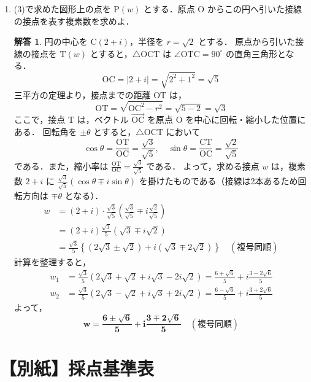 \documentclass[dvipdfmx]{jlreq}
\theoremstyle{definition}
\newtheorem*{solution}{解答}
\begin{document}
\begin{enumerate}[label=(\arabic*)]
    \item (3)で求めた図形上の点を $\mathrm{P}(w)$ とする．原点 $\mathrm{O}$ からこの円へ引いた接線の接点を表す複素数を求めよ．
    \begin{solution}
    円の中心を $\mathrm{C}(2+i)$，半径を $r=\sqrt{2}$ とする．
    原点から引いた接線の接点を $\mathrm{T}(w)$ とすると，$\triangle \mathrm{OCT}$ は $\angle \mathrm{OTC} = 90^\circ$ の直角三角形となる．
    \[ \mathrm{OC} = |2+i| = \sqrt{2^2+1^2} = \sqrt{5} \]
    三平方の定理より，接点までの距離 $\mathrm{OT}$ は，
    \[ \mathrm{OT} = \sqrt{\mathrm{OC}^2 - r^2} = \sqrt{5 - 2} = \sqrt{3} \]
    ここで，接点 $\mathrm{T}$ は，ベクトル $\vec{\mathrm{OC}}$ を原点 $\mathrm{O}$ を中心に回転・縮小した位置にある．
    回転角を $\pm \theta$ とすると，$\triangle \mathrm{OCT}$ において
    \[ \cos \theta = \frac{\mathrm{OT}}{\mathrm{OC}} = \frac{\sqrt{3}}{\sqrt{5}}, \quad \sin \theta = \frac{\mathrm{CT}}{\mathrm{OC}} = \frac{\sqrt{2}}{\sqrt{5}} \]
    である．また，縮小率は $\displaystyle\frac{\mathrm{OT}}{\mathrm{OC}} = \frac{\sqrt{3}}{\sqrt{5}}$ である．
    よって，求める接点 $w$ は，複素数 $2+i$ に $\displaystyle\frac{\sqrt{3}}{\sqrt{5}} (\cos \theta \mp i \sin \theta)$ を掛けたものである（接線は2本あるため回転方向は $\mp \theta$ となる）．
    \begin{align*}
        w &= (2+i) \cdot \frac{\sqrt{3}}{\sqrt{5}} \left( \frac{\sqrt{3}}{\sqrt{5}} \mp i \frac{\sqrt{2}}{\sqrt{5}} \right) \\
          &= (2+i) \frac{\sqrt{3}}{5} (\sqrt{3} \mp i\sqrt{2}) \\
          &= \frac{\sqrt{3}}{5} \left\{ (2\sqrt{3} \pm \sqrt{2}) + i(\sqrt{3} \mp 2\sqrt{2}) \right\} \quad (\text{複号同順})
    \end{align*}
    計算を整理すると，
    \begin{align*}
        w_1 &= \frac{\sqrt{3}}{5} (2\sqrt{3} + \sqrt{2} + i\sqrt{3} - 2i\sqrt{2}) = \frac{6+\sqrt{6}}{5} + i \frac{3-2\sqrt{6}}{5} \\
        w_2 &= \frac{\sqrt{3}}{5} (2\sqrt{3} - \sqrt{2} + i\sqrt{3} + 2i\sqrt{2}) = \frac{6-\sqrt{6}}{5} + i \frac{3+2\sqrt{6}}{5}
    \end{align*}
    よって，
    \[ \bm{w = \frac{6 \pm \sqrt{6}}{5} + i \frac{3 \mp 2\sqrt{6}}{5} \quad (\text{複号同順})} \]
    \end{solution}
\end{enumerate}

\newpage

\section*{【別紙】採点基準表}
\end{document}
